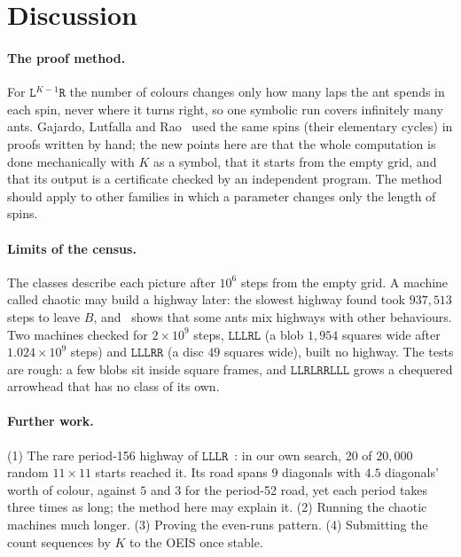 \documentclass[11pt,a4paper]{article}
\theoremstyle{definition}
\theoremstyle{remark}
\newcommand{\Lw}{\mathtt{L}}
\newcommand{\Rw}{\mathtt{R}}
\begin{document}
\section{Discussion}\label{sec:discussion}

\paragraph{The proof method.} For $\Lw^{K-1}\Rw$ the number of colours changes only how many laps the ant spends
in each spin, never where it turns right, so one symbolic run covers infinitely many ants. Gajardo, Lutfalla and
Rao~\cite{glr} used the same spins (their elementary cycles) in proofs written by hand; the new points here are
that the whole computation is done mechanically with $K$ as a symbol, that it starts from the empty grid, and
that its output is a certificate checked by an independent program. The method should apply to other families
in which a parameter changes only the length of spins.

\paragraph{Limits of the census.} The classes describe each picture after $10^6$ steps from the empty grid. A
machine called chaotic may build a highway later: the slowest highway found took $937{,}513$ steps to leave $B$,
and~\cite{lutfalla-sideways} shows that some ants mix highways with other behaviours. Two machines checked for
$2 \times 10^9$ steps, $\Lw\Lw\Lw\Rw\Lw$ (a blob $1{,}954$ squares wide after $1.024 \times 10^9$ steps) and
$\Lw\Lw\Lw\Rw\Rw$ (a disc $49$ squares wide), built no highway. The tests are rough: a few blobs sit inside square
frames, and $\Lw\Lw\Rw\Lw\Rw\Rw\Lw\Lw\Lw$ grows a chequered arrowhead that has no class of its own.

\paragraph{Further work.} (1) The rare period-156 highway of $\Lw\Lw\Lw\Rw$~\cite{lutfalla-lllr}: in our own
search, $20$ of $20{,}000$ random $11 \times 11$ starts reached it. Its road spans $9$ diagonals with $4.5$ diagonals'
worth of colour, against $5$ and $3$ for the period-52 road, yet each period takes three times as long; the method
here may explain it. (2) Running the chaotic machines much longer. (3) Proving the even-runs pattern. (4) Submitting
the count sequences by $K$ to the OEIS once stable.
\end{document}
